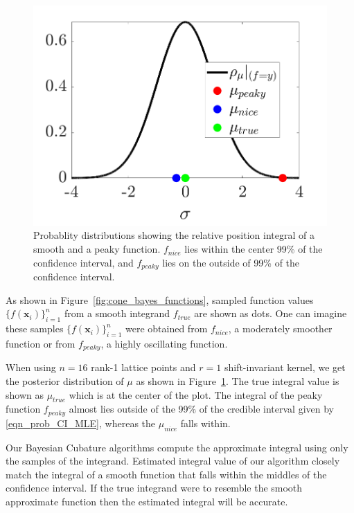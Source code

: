 \documentclass{iitthesis}          %
\newcommand{\bm}[1]{\boldsymbol{#1}}
\newcommand{\vx}{\bm{x}}
\newcommand\figref{Figure~\ref}
\newcommand{\JRNote}[1]{{\textcolor{green}{JR: #1}}}
\begin{document}
\begin{figure}[ht]
	\centering
	\includegraphics[width=0.9\linewidth]{cone_bayes_mu_pdf}
	\caption{Probablity distributions showing the relative position integral of a smooth and a peaky function. $f_{nice}$ lies within the center 99\% of the confidence interval, and $f_{peaky}$ lies on the outside of 99\% of  the confidence interval.}
	\label{fig:cone_bayes_posterior}
\end{figure}

As shown in \figref{fig:cone_bayes_functions}, sampled function values $\{f(\vx_i)\}_{i=1}^n$ from a smooth integrand $f_{true}$ are shown as dots. One can imagine these samples $\{f(\vx_i)\}_{i=1}^n$ were obtained from $f_{nice}$, a moderately smoother function or from $f_{peaky}$, a highly oscillating function.

When using $n=16$ rank-1 lattice points and $r=1$ shift-invariant kernel, we get the posterior distribution of $\mu$ as shown in \figref{fig:cone_bayes_posterior}. The true integral value is shown as $\mu_{true}$ which is at the center of the plot. The integral of the peaky function $f_{peaky}$ almost lies outside of the 99\% of the credible interval given by \eqref{eqn_prob_CI_MLE}, whereas the $\mu_{nice}$ falls within.

Our Bayesian Cubature algorithms compute the approximate integral using only the samples of the integrand. 
Estimated integral value of our algorithm closely match the integral of a smooth function that falls within the middles of the confidence interval. If the true integrand were to resemble the smooth approximate function then the estimated integral will be accurate.  
\end{document}
